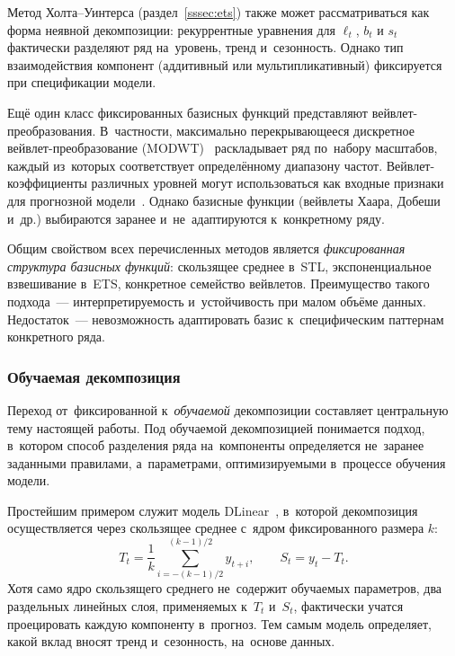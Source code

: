 Метод Холта--Уинтерса (раздел~\ref{sssec:ets}) также может
рассматриваться как форма неявной декомпозиции: рекуррентные уравнения
для $\ell_t$, $b_t$ и $s_t$ фактически разделяют ряд на~уровень, тренд
и~сезонность.  Однако тип взаимодействия компонент (аддитивный или
мультипликативный) фиксируется при спецификации модели.

Ещё один класс фиксированных базисных функций представляют
вейвлет-преобразования.  В~частности, максимально перекрывающееся
дискретное вейвлет-преобразование (MODWT)~\cite{percival2000wavelet}
раскладывает ряд по~набору масштабов, каждый из~которых соответствует
определённому диапазону частот.  Вейвлет-коэффициенты различных
уровней могут использоваться как входные признаки для прогнозной
модели~\cite{percival1995wavelet}.  Однако базисные функции (вейвлеты
Хаара, Добеши и~др.) выбираются заранее и~не~адаптируются к~конкретному
ряду.

Общим свойством всех перечисленных методов является \textit{фиксированная
структура базисных функций}: скользящее среднее в~STL, экспоненциальное
взвешивание в~ETS, конкретное семейство вейвлетов.  Преимущество такого
подхода~--- интерпретируемость и~устойчивость при малом объёме данных.
Недостаток~--- невозможность адаптировать базис к~специфическим
паттернам конкретного ряда.


\subsubsection{Обучаемая декомпозиция}
\label{sssec:learnable-decomposition}

Переход от~фиксированной к~\textit{обучаемой} декомпозиции составляет
центральную тему настоящей работы.  Под обучаемой декомпозицией
понимается подход, в~котором способ разделения ряда на~компоненты
определяется не~заранее заданными правилами, а~параметрами, оптимизируемыми
в~процессе обучения модели.

Простейшим примером служит модель DLinear~\cite{zeng2023transformers},
в~которой декомпозиция осуществляется через скользящее среднее с~ядром
фиксированного размера $k$:
\begin{equation}
\label{eq:dlinear-decomp}
T_t = \frac{1}{k}\sum_{i=-(k-1)/2}^{(k-1)/2} y_{t+i}, \qquad
S_t = y_t - T_t.
\end{equation}
Хотя само ядро скользящего среднего не~содержит обучаемых параметров,
два раздельных линейных слоя, применяемых к~$T_t$ и~$S_t$, фактически
учатся проецировать каждую компоненту в~прогноз.  Тем самым модель
определяет, какой вклад вносят тренд и~сезонность, на~основе данных.


